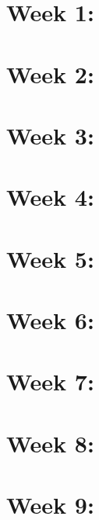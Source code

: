 \documentclass{article}
\title{\thistitle}
\author{\me}
\date{\today}
\begin{document}
\maketitle
\pagebreak

\centering
\section*{Week 1: \titleone}

\pagebreak

\centering
\section*{Week 2: \titletwo}

\pagebreak

\centering
\section*{Week 3: \titlethree}

\pagebreak

\centering
\section*{Week 4: \titlefour}

\pagebreak

\centering
\section*{Week 5: \titlefive}

\pagebreak

\centering
\section*{Week 6: \titlesix}

\pagebreak

\centering
\section*{Week 7: \titleseven}

\pagebreak

\centering
\section*{Week 8: \titleeight}

\pagebreak

\centering
\section*{Week 9: \titlenine}

\pagebreak
\end{document}
